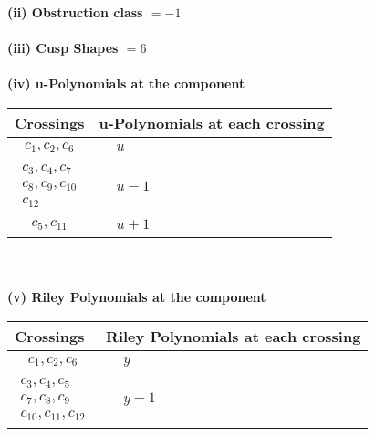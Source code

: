 \documentclass[1p]{elsarticle_modified}
\theoremstyle{definition}
\begin{document}
\flushleft \textbf{(ii) Obstruction class $= -1$}\\~\\
\flushleft \textbf{(iii) Cusp Shapes $= 6$}\\~\\
\newpage\renewcommand{\arraystretch}{1}
\flushleft \textbf{(iv) u-Polynomials at the component}\newline \\
\begin{tabular}{m{50pt}|m{274pt}}
Crossings & \hspace{64pt}u-Polynomials at each crossing \\
\hline $$\begin{aligned}c_{1},c_{2},c_{6}\end{aligned}$$&$\begin{aligned}
&u
\end{aligned}$\\
\hline $$\begin{aligned}c_{3},c_{4},c_{7}\\c_{8},c_{9},c_{10}\\c_{12}\end{aligned}$$&$\begin{aligned}
&u-1
\end{aligned}$\\
\hline $$\begin{aligned}c_{5},c_{11}\end{aligned}$$&$\begin{aligned}
&u+1
\end{aligned}$\\
\hline
\end{tabular}\\~\\
\newpage\renewcommand{\arraystretch}{1}
\flushleft \textbf{(v) Riley Polynomials at the component}\newline \\
\begin{tabular}{m{50pt}|m{274pt}}
Crossings & \hspace{64pt}Riley Polynomials at each crossing \\
\hline $$\begin{aligned}c_{1},c_{2},c_{6}\end{aligned}$$&$\begin{aligned}
&y
\end{aligned}$\\
\hline $$\begin{aligned}c_{3},c_{4},c_{5}\\c_{7},c_{8},c_{9}\\c_{10},c_{11},c_{12}\end{aligned}$$&$\begin{aligned}
&y-1
\end{aligned}$\\
\hline
\end{tabular}\\~\\
\end{document}
